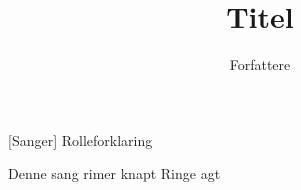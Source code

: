 \documentclass[a4paper,11pt]{article}
\title{Titel}
\author{Forfattere}
\begin{document}
\maketitle

\begin{roles}
[Sanger] Rolleforklaring
\end{roles}

\begin{song}
%
Denne sang rimer knapt
Ringe agt
\end{song}
\end{document}
